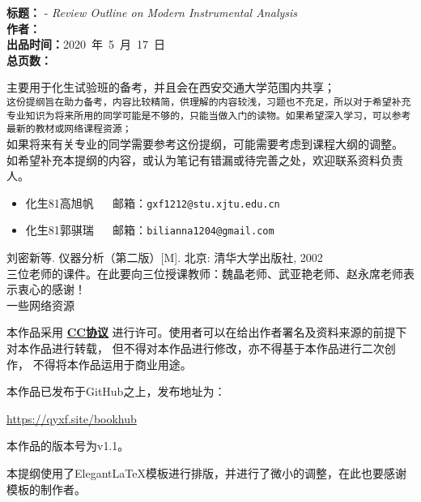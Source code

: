 \newpage
\hypersetup{pageanchor=true}

\begin{tcolorbox}[title={\bfseries 作品信息}]
	\makeatletter
	 \textbf{标题：}\@title{} - \textit{Review Outline on Modern Instrumental Analysis}\\
	 \textbf{作者：}\@author\\
	 \textbf{出品时间：}2020\ 年\ 5\ 月\ 17\ 日\\ %
	 \textbf{总页数：}\pageref{LastPage}
	\makeatother
\end{tcolorbox}

\begin{tcolorbox}[title={\bfseries 关于本提纲用途的说明}]
 主要用于化生试验班的备考，并且会在西安交通大学范围内共享；\\
 \texttt{这份提纲旨在助力备考，内容比较精简，供理解的内容较浅，习题也不充足，所以对于希望补充专业知识为将来所用的同学可能是不够的，只能当做入门的读物。如果希望深入学习，可以参考最新的教材或网络课程资源；}\\
 如果将来有关专业的同学需要参考这份提纲，可能需要考虑到课程大纲的调整。
 如希望补充本提纲的内容，或认为笔记有错漏或待完善之处，欢迎联系资料负责人。
\begin{itemize}
	\item 化生81\hspace{1em}高旭帆\hspace{1em} \faEnvelopeOpen ~~ 邮箱：\texttt{gxf1212@stu.xjtu.edu.cn}
	\item 化生81\hspace{1em}郭骐瑞\hspace{1em} \faEnvelopeOpen ~~ 邮箱：\texttt{bilianna1204@gmail.com}
\end{itemize}
\end{tcolorbox}

\begin{tcolorbox}[title={\bfseries 主要参考资料}]
 刘密新等. 仪器分析（第二版）[M]. 北京: 清华大学出版社, 2002\\
 三位老师的课件。在此要向三位授课教师：魏晶老师、武亚艳老师、赵永席老师表示衷心的感谢！\\
 一些网络资源
\end{tcolorbox}


\begin{tcolorbox}[title={\bfseries 许可证说明}]
\centerline{}
本作品采用 \href{https://creativecommons.org/licenses/by-nc-nd/4.0/}{\textbf{CC协议}}
进行许可。使用者可以在给出作者署名及资料来源的前提下对本作品进行转载，
但不得对本作品进行修改，亦不得基于本作品进行二次创作，
不得将本作品运用于商业用途。
\end{tcolorbox}

\begin{tcolorbox}
	本作品已发布于GitHub之上，发布地址为：\\
	\centerline{\url{https://qyxf.site/bookhub}}
	本作品的版本号为\textsf{v1.1}。
	
	本提纲使用了Elegant\LaTeX 模板进行排版，并进行了微小的调整，在此也要感谢模板的制作者。
\end{tcolorbox}



